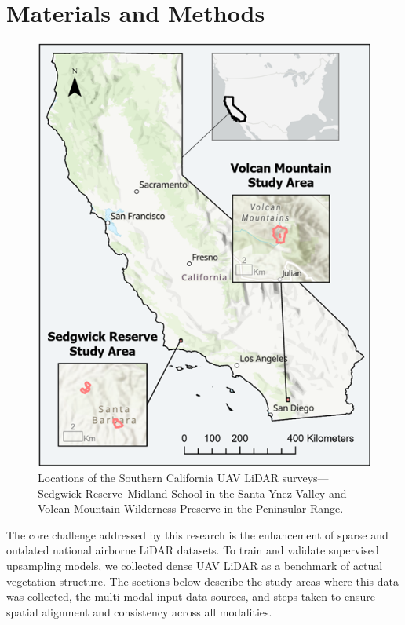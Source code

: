 \documentclass[preprints,article,accept,pdftex,moreauthors]{Definitions/mdpi}
\begin{document}
\section{Materials and Methods}
\begin{figure}
  \vspace{-38pt}  
  \captionsetup{aboveskip=2pt, belowskip=0pt} %
  \centering
  \includegraphics[trim=0mm 0mm 0mm 0mm, clip, width=\linewidth]
                  {manuscript/figures/Overall_Study_Areas_v2.png}
  \caption{Locations of the Southern California UAV LiDAR surveys—Sedgwick
           Reserve–Midland School in the Santa Ynez Valley and Volcan Mountain
           Wilderness Preserve in the Peninsular Range.}
  \label{fig:overall_study_area}
\end{figure}

The core challenge addressed by this research is the enhancement of sparse and outdated national airborne LiDAR datasets. To train and validate supervised upsampling models, we collected dense UAV LiDAR as a benchmark of actual vegetation structure. The sections below describe the study areas where this data was collected, the multi-modal input data sources, and steps taken to ensure spatial alignment and consistency across all modalities.
\end{document}

